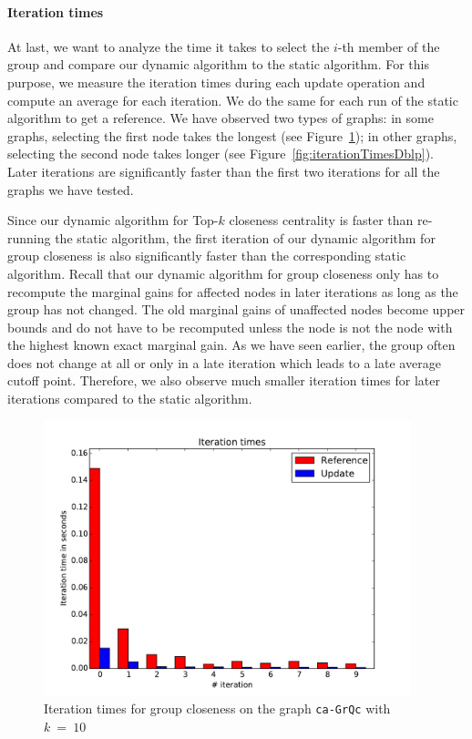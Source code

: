 \paragraph{Iteration times}
At last, we want to analyze the time it takes to select the $i$-th member of the group and compare our dynamic algorithm to the static algorithm. For this purpose, we measure the iteration times during each update operation and compute an average for each iteration. We do the same for each run of the static algorithm to get a reference.  We have observed two types of graphs: in some graphs, selecting the first node takes the longest (see Figure~\ref{fig:iterationTimesCaGrQc}); in other graphs, selecting the second node takes longer (see Figure~\ref{fig:iterationTimesDblp}). Later iterations are significantly faster than the first two iterations for all the graphs we have tested.

Since our dynamic algorithm for Top-$k$ closeness centrality is faster than re-running the static algorithm, the first iteration of our dynamic algorithm for group closeness is also significantly faster than the corresponding static algorithm. Recall that our dynamic algorithm for group closeness only has to recompute the marginal gains for affected nodes in later iterations as long as the group has not changed. The old marginal gains of unaffected nodes become upper bounds and do not have to be recomputed unless the node is not the node with the highest known exact marginal gain. As we have seen earlier, the group often does not change at all or only in a late iteration which leads to a late average cutoff point. Therefore, we also observe much smaller iteration times for later iterations compared to the static algorithm.


\begin{figure}[h!]
	\includegraphics[width=0.95\textwidth]{figures/iterations_ca-GrQc_10}
	\caption{Iteration times for group closeness on the graph \texttt{ca-GrQc} with $k~=~10$}
	\label{fig:iterationTimesCaGrQc}
\end{figure}

